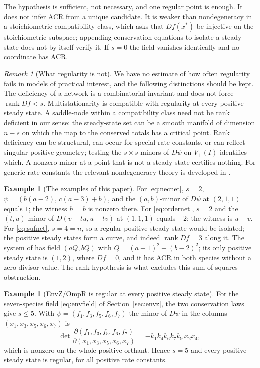 \documentclass[11pt,a4paper]{article}
\theoremstyle{plain}
\theoremstyle{definition}
\newtheorem{example}[theorem]{Example}
\theoremstyle{remark}
\newtheorem{remark}[theorem]{Remark}
\newcommand{\rank}{\operatorname{rank}}
\begin{document}
The hypothesis is sufficient, not necessary, and one regular point is enough. It does not infer ACR from a unique candidate. It is weaker than nondegeneracy in a stoichiometric compatibility class, which asks that $Df(x^*)$ be injective on the stoichiometric subspace; appending conservation equations to isolate a steady state does not by itself verify it. If $s=0$ the field vanishes identically and no coordinate has ACR.

\begin{remark}[What regularity is not]\label{rem:notdeficiency}
We have no estimate of how often regularity fails in models of practical interest, and the following distinctions should be kept. The deficiency of a network is a combinatorial invariant and does not force $\rank Df<s$. Multistationarity is compatible with regularity at every positive steady state. A saddle-node within a compatibility class need not be rank deficient in our sense: the steady-state set can be a smooth manifold of dimension $n-s$ on which the map to the conserved totals has a critical point. Rank deficiency can be structural, can occur for special rate constants, or can reflect singular positive geometry; testing the $s\times s$ minors of $D\psi$ on $V_+(I)$ identifies which. A nonzero minor at a point that is not a steady state certifies nothing. For generic rate constants the relevant nondegeneracy theory is developed in \cite{generic}.
\end{remark}

\begin{example}[The examples of this paper]\label{ex:ranks}
For \eqref{eq:necnet}, $s=2$, $\psi=(b(a-2),\,c(a-3)+b)$, and the $(a,b)$-minor of $D\psi$ at $(2,1,1)$ equals $1$; the witness $h=b$ is nonzero there. For \eqref{eq:ordernet}, $s=2$ and the $(t,u)$-minor of $D(v-tu,u-tv)$ at $(1,1,1)$ equals $-2$; the witness is $u+v$. For \eqref{eq:sufnet}, $s=4=n$, so a regular positive steady state would be isolated; the positive steady states form a curve, and indeed $\rank Df=3$ along it. The system of \cite[Example 3.11]{acr} has field $(aQ,bQ)$ with $Q=(a-1)^2+(b-2)^2$; its only positive steady state is $(1,2)$, where $Df=0$, and it has ACR in both species without a zero-divisor value. The rank hypothesis is what excludes this sum-of-squares obstruction.
\end{example}

\begin{example}[EnvZ/OmpR is regular at every positive steady state]\label{ex:envzminor}
For the seven-species field \eqref{eq:envfield} of Section~\ref{sec:envz}, the two conservation laws give $s\le5$. With $\psi=(f_1,f_3,f_5,f_6,f_7)$ the minor of $D\psi$ in the columns $(x_1,x_3,x_5,x_6,x_7)$ is
\begin{equation}\label{eq:envminor}
  \det\frac{\partial(f_1,f_3,f_5,f_6,f_7)}{\partial(x_1,x_3,x_5,x_6,x_7)}=-k_1k_4k_6k_7k_9\,x_2x_4 ,
\end{equation}
which is nonzero on the whole positive orthant. Hence $s=5$ and every positive steady state is regular, for all positive rate constants.
\end{example}
\end{document}
